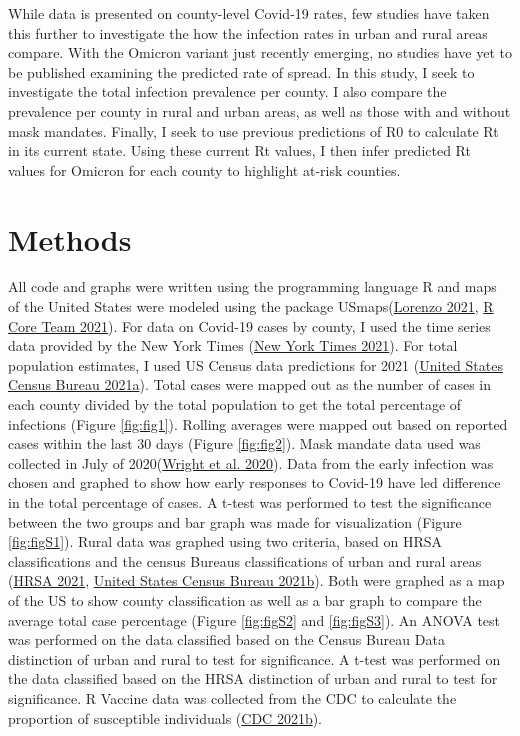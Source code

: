 \documentclass[
  12pt,
]{article}
\begin{document}
While data is presented on county-level Covid-19 rates, few studies have taken this further to investigate the how the infection rates in urban and rural areas compare. With the Omicron variant just recently emerging, no studies have yet to be published examining the predicted rate of spread. In this study, I seek to investigate the total infection prevalence per county. I also compare the prevalence per county in rural and urban areas, as well as those with and without mask mandates. Finally, I seek to use previous predictions of R0 to calculate Rt in its current state. Using these current Rt values, I then infer predicted Rt values for Omicron for each county to highlight at-risk counties.

\hypertarget{methods}{%
\section{Methods}\label{methods}}

All code and graphs were written using the programming language R and maps of the United States were modeled using the package USmaps(\protect\hyperlink{ref-lorenzo_usmap_2021}{Lorenzo 2021}, \protect\hyperlink{ref-r_core_team_r_2021}{R Core Team 2021}). For data on Covid-19 cases by county, I used the time series data provided by the New York Times (\protect\hyperlink{ref-new_york_times_coronavirus_2021}{New York Times 2021}). For total population estimates, I used US Census data predictions for 2021 (\protect\hyperlink{ref-united_states_census_bureau_county_2021}{United States Census Bureau 2021a}). Total cases were mapped out as the number of cases in each county divided by the total population to get the total percentage of infections (Figure \ref{fig:fig1}). Rolling averages were mapped out based on reported cases within the last 30 days (Figure \ref{fig:fig2}). Mask mandate data used was collected in July of 2020(\protect\hyperlink{ref-wright_tracking_2020}{Wright et al. 2020}). Data from the early infection was chosen and graphed to show how early responses to Covid-19 have led difference in the total percentage of cases. A t-test was performed to test the significance between the two groups and bar graph was made for visualization (Figure \ref{fig:figS1}). Rural data was graphed using two criteria, based on HRSA classifications and the census Bureaus classifications of urban and rural areas (\protect\hyperlink{ref-hrsa_defining_2021}{HRSA 2021}, \protect\hyperlink{ref-united_states_census_bureau_2010_2021}{United States Census Bureau 2021b}). Both were graphed as a map of the US to show county classification as well as a bar graph to compare the average total case percentage (Figure \ref{fig:figS2} and \ref{fig:figS3}). An ANOVA test was performed on the data classified based on the Census Bureau Data distinction of urban and rural to test for significance. A t-test was performed on the data classified based on the HRSA distinction of urban and rural to test for significance. R Vaccine data was collected from the CDC to calculate the proportion of susceptible individuals (\protect\hyperlink{ref-cdc_covid-19_2021}{CDC 2021b}).
\end{document}
